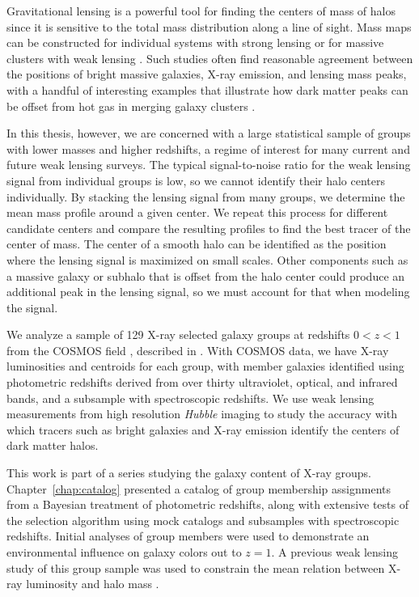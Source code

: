 Gravitational lensing is a powerful tool for finding the centers of mass of halos
since it is sensitive to the total mass distribution along a line of
sight. Mass maps can be constructed for individual systems with strong
lensing or for massive clusters with weak lensing
\citep[e.g.,][]{Smith2005b, Oguri2010, Shan2010}. Such studies often 
find reasonable agreement between the positions of bright massive
galaxies, X-ray emission, and lensing mass peaks, with a handful of
interesting examples that illustrate how dark matter peaks can be
offset from hot gas in merging galaxy clusters
\citep[e.g.,][]{Clowe2004, Bradac2008}. 

In this thesis, however, we are concerned with a large statistical
sample of groups with lower masses and higher redshifts, a regime of
interest for many current and future weak lensing surveys. The typical
signal-to-noise ratio for the weak lensing signal from individual groups is
low, so we cannot identify their halo centers individually. By stacking
the lensing signal from many groups, we determine the mean mass
profile around a given center. We repeat this process for
different candidate centers and compare the resulting profiles to find
the best tracer of the center of mass.
The center of a smooth halo can be identified as the position where
the lensing signal is maximized on small scales. Other components such
as a massive galaxy or subhalo that is offset from the halo center
could produce an additional peak in the lensing signal, so we must
account for that when modeling the signal.

We analyze a sample of 129 X-ray selected galaxy groups at redshifts
$0<z<1$ from the COSMOS field \citep{Scoville2007a}, described in
\citet{George2011}.  With 
COSMOS data, we have X-ray luminosities and centroids for each group,
with member galaxies identified using photometric redshifts derived
from over thirty ultraviolet, optical, and infrared bands, and a
subsample with spectroscopic redshifts. We use weak lensing
measurements from high resolution \textit{Hubble} imaging to study the
accuracy with which tracers such as bright galaxies and X-ray emission
identify the centers of dark matter halos.

This work is part of a series studying the galaxy content of
X-ray groups. Chapter~\ref{chap:catalog} \citep{George2011} presented a
catalog of group membership assignments from a Bayesian treatment of
photometric redshifts, along with extensive tests of the selection
algorithm using mock catalogs and subsamples with spectroscopic
redshifts. Initial analyses of group members were used
to demonstrate an environmental influence on galaxy colors out to
$z=1$. A previous weak lensing study of this group sample was used to
constrain the mean relation between X-ray luminosity and halo mass
\citep{Leauthaud2010}. 

